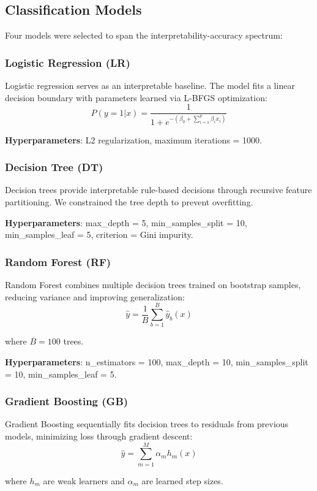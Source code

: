 \documentclass[journal]{IEEEtran}
\begin{document}
\subsection{Classification Models}

Four models were selected to span the interpretability-accuracy spectrum:

\subsubsection{Logistic Regression (LR)}
Logistic regression serves as an interpretable baseline. The model fits a linear decision boundary with parameters learned via L-BFGS optimization:
\[
P(y=1|x) = \frac{1}{1 + e^{-(\beta_0 + \sum_{i=1}^{p} \beta_i x_i)}}
\]

\textbf{Hyperparameters}: L2 regularization, maximum iterations = 1000.

\subsubsection{Decision Tree (DT)}
Decision trees provide interpretable rule-based decisions through recursive feature partitioning. We constrained the tree depth to prevent overfitting.

\textbf{Hyperparameters}: max\_depth = 5, min\_samples\_split = 10, min\_samples\_leaf = 5, criterion = Gini impurity.

\subsubsection{Random Forest (RF)}
Random Forest combines multiple decision trees trained on bootstrap samples, reducing variance and improving generalization:
\[
\hat{y} = \frac{1}{B} \sum_{b=1}^{B} \hat{y}_b(x)
\]

where $B = 100$ trees.

\textbf{Hyperparameters}: n\_estimators = 100, max\_depth = 10, min\_samples\_split = 10, min\_samples\_leaf = 5.

\subsubsection{Gradient Boosting (GB)}
Gradient Boosting sequentially fits decision trees to residuals from previous models, minimizing loss through gradient descent:
\[
\hat{y} = \sum_{m=1}^{M} \alpha_m h_m(x)
\]

where $h_m$ are weak learners and $\alpha_m$ are learned step sizes.
\end{document}
